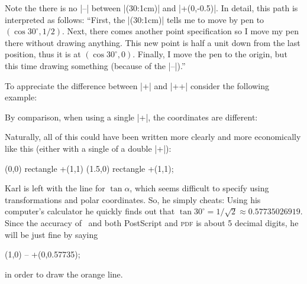 Note the there is no |--| between |(30:1cm)| and |+(0,-0.5)|. In
detail, this path is interpreted as follows: ``First, the |(30:1cm)|
tells me to move by pen to $(\cos 30^\circ,1/2)$. Next, there comes
another point specification so I move my pen there without drawing
anything. This new point is half a unit down from the last position,
thus it is at $(\cos 30^\circ,0)$. Finally, I move the pen to the
origin, but this time drawing something (because of the |--|).''

To appreciate the difference between |+| and |++| consider the
following example:

\begin{codeexample}[]
\end{codeexample}

By comparison, when using a single |+|, the coordinates are different:

\begin{codeexample}[]
\end{codeexample}


Naturally, all of this could have been written more clearly and more
economically like this (either with a single of a double |+|): 
\begin{codeexample}[]
\tikz \draw (0,0) rectangle +(1,1)  (1.5,0) rectangle +(1,1);
\end{codeexample}



Karl is left with the line for $\tan \alpha$, which seems difficult to
specify using transformations and polar coordinates. So, he simply
cheats: Using his computer's calculator he quickly finds out that
$\tan 30^\circ = 1/\sqrt 2 \approx 0.57735026919$. Since the accuracy
of \pgfname\ and both PostScript and \textsc{pdf} is about 5 decimal
digits, he will be just fine by saying
\begin{codeexample}
 (1,0) -- +(0,0.57735);
\end{codeexample}
in order to draw the orange line.

